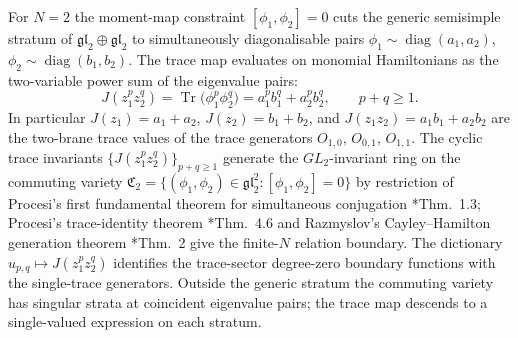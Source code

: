 \documentclass[11pt]{memoir}
\begin{document}
\begin{ex}[Two Dirac branes, generic commuting pair, \(N=2\)]
\label{exa:two-branes-generic}
  For \(N=2\) the moment-map constraint \([\phi_1,\phi_2]=0\) cuts
  the generic semisimple stratum of
  \(\mathfrak{gl}_2\oplus\mathfrak{gl}_2\) to simultaneously
  diagonalisable pairs
  \(\phi_1\sim\operatorname{diag}(a_1,a_2)\),
  \(\phi_2\sim\operatorname{diag}(b_1,b_2)\).  The trace map evaluates
  on monomial Hamiltonians as the two-variable power sum of the
  eigenvalue pairs:
  \[
    J(z_1^pz_2^q)
       =\operatorname{Tr}\bigl(\phi_1^p\phi_2^q\bigr)
       =a_1^pb_1^q+a_2^pb_2^q,\qquad p+q\geq 1.
  \]
  In particular \(J(z_1)=a_1+a_2\), \(J(z_2)=b_1+b_2\), and
  \(J(z_1z_2)=a_1b_1+a_2b_2\) are the two-brane trace values of the
  trace generators \(O_{1,0}\), \(O_{0,1}\), \(O_{1,1}\).  The cyclic
  trace invariants \(\{J(z_1^pz_2^q)\}_{p+q\geq 1}\) generate the
  \(GL_2\)-invariant ring on the commuting variety
  \(\mathfrak C_2=\{(\phi_1,\phi_2)\in\mathfrak{gl}_2^2
    :[\phi_1,\phi_2]=0\}\) by restriction of Procesi's first
  fundamental theorem for simultaneous conjugation
  \cite{procesi}*{Thm.~1.3}; Procesi's trace-identity theorem
  \cite{procesi}*{Thm.~4.6} and Razmyslov's Cayley--Hamilton
  generation theorem \cite{razmyslov}*{Thm.~2} give the finite-\(N\)
  relation boundary.  The dictionary
  \(u_{p,q}\mapsto J(z_1^pz_2^q)\) identifies the trace-sector
  degree-zero boundary functions with the single-trace generators.
  Outside the generic stratum the
  commuting variety has singular strata at coincident eigenvalue pairs;
  the trace map descends to a single-valued
  expression on each stratum.


\end{ex}
\end{document}
